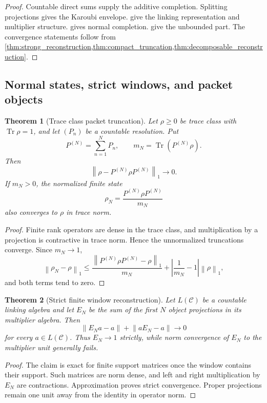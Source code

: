 \documentclass{aomart}
\newtheorem{theorem}{Theorem}[section]
\theoremstyle{definition}
\theoremstyle{remark}
\newcommand{\Ccal}{\mathcal C}
\newcommand{\Tr}{\operatorname{Tr}}
\newcommand{\norm}[1]{\left\lVert#1\right\rVert}
\begin{document}
\begin{proof}
Countable direct sums supply the additive completion. Splitting projections gives the Karoubi envelope.  give the linking representation and multiplier structure.  gives normal completion.  give the unbounded part. The convergence statements follow from \cref{thm:strong_reconstruction,thm:compact_truncation,thm:decomposable_reconstruction}.
\end{proof}

\subsection{Normal states, strict windows, and packet objects}

\begin{theorem}[Trace class packet truncation]\label{thm:trace_state_truncation}
Let \(\rho\geq0\) be trace class with \(\Tr\rho=1\), and let \((P_n)\) be a countable resolution. Put
\[
 P^{(N)}=\sum_{n=1}^{N}P_n,
 \qquad
 m_N=\Tr(P^{(N)}\rho).
\]
Then
\[
 \boxed{
 \norm{\rho-P^{(N)}\rho P^{(N)}}_1\longrightarrow0.
 }
\]
If \(m_N>0\), the normalized finite state
\[
 \rho_N=\frac{P^{(N)}\rho P^{(N)}}{m_N}
\]
also converges to \(\rho\) in trace norm.
\end{theorem}

\begin{proof}
Finite rank operators are dense in the trace class, and multiplication by a projection is contractive in trace norm. Hence the unnormalized truncations converge. Since \(m_N\to1\),
\[
 \norm{\rho_N-\rho}_1
 \leq
 \frac{\norm{P^{(N)}\rho P^{(N)}-\rho}_1}{m_N}
 +
 \left|\frac1{m_N}-1\right|\norm\rho_1,
\]
and both terms tend to zero.
\end{proof}

\begin{theorem}[Strict finite window reconstruction]\label{thm:strict_windows}
Let \(L(\Ccal)\) be a countable linking algebra and let \(E_N\) be the sum of the first \(N\) object projections in its multiplier algebra. Then
\[
 \boxed{
 \norm{E_Na-a}+\norm{aE_N-a}\longrightarrow0
 }
\]
for every \(a\in L(\Ccal)\). Thus \(E_N\to1\) strictly, while norm convergence of \(E_N\) to the multiplier unit generally fails.
\end{theorem}

\begin{proof}
The claim is exact for finite support matrices once the window contains their support. Such matrices are norm dense, and left and right multiplication by \(E_N\) are contractions. Approximation proves strict convergence. Proper projections remain one unit away from the identity in operator norm.
\end{proof}
\end{document}
